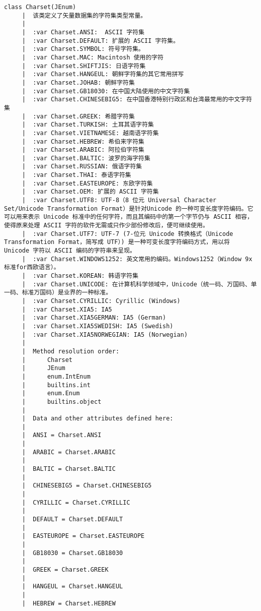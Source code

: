 \documentclass[11pt]{article}
\begin{document}
\begin{Verbatim}[commandchars=\\\{\}]
    class Charset(JEnum)
     |  该类定义了矢量数据集的字符集类型常量。
     |  
     |  :var Charset.ANSI:  ASCII 字符集
     |  :var Charset.DEFAULT: 扩展的 ASCII 字符集。
     |  :var Charset.SYMBOL: 符号字符集。
     |  :var Charset.MAC: Macintosh 使用的字符
     |  :var Charset.SHIFTJIS: 日语字符集
     |  :var Charset.HANGEUL: 朝鲜字符集的其它常用拼写
     |  :var Charset.JOHAB: 朝鲜字符集
     |  :var Charset.GB18030: 在中国大陆使用的中文字符集
     |  :var Charset.CHINESEBIG5: 在中国香港特别行政区和台湾最常用的中文字符集
     |  :var Charset.GREEK: 希腊字符集
     |  :var Charset.TURKISH: 土耳其语字符集
     |  :var Charset.VIETNAMESE: 越南语字符集
     |  :var Charset.HEBREW: 希伯来字符集
     |  :var Charset.ARABIC: 阿拉伯字符集
     |  :var Charset.BALTIC: 波罗的海字符集
     |  :var Charset.RUSSIAN: 俄语字符集
     |  :var Charset.THAI: 泰语字符集
     |  :var Charset.EASTEUROPE: 东欧字符集
     |  :var Charset.OEM: 扩展的 ASCII 字符集
     |  :var Charset.UTF8: UTF-8（8 位元 Universal Character Set/Unicode Transformation Format）是针对Unicode 的一种可变长度字符编码。它可以用来表示 Unicode 标准中的任何字符，而且其编码中的第一个字节仍与 ASCII 相容，使得原来处理 ASCII 字符的软件无需或只作少部份修改后，便可继续使用。
     |  :var Charset.UTF7: UTF-7 (7-位元 Unicode 转换格式（Unicode Transformation Format，简写成 UTF）) 是一种可变长度字符编码方式，用以将 Unicode 字符以 ASCII 编码的字符串来呈现。
     |  :var Charset.WINDOWS1252: 英文常用的编码。Windows1252（Window 9x标准for西欧语言）。
     |  :var Charset.KOREAN: 韩语字符集
     |  :var Charset.UNICODE: 在计算机科学领域中，Unicode（统一码、万国码、单一码、标准万国码）是业界的一种标准。
     |  :var Charset.CYRILLIC: Cyrillic (Windows)
     |  :var Charset.XIA5: IA5
     |  :var Charset.XIA5GERMAN: IA5 (German)
     |  :var Charset.XIA5SWEDISH: IA5 (Swedish)
     |  :var Charset.XIA5NORWEGIAN: IA5 (Norwegian)
     |  
     |  Method resolution order:
     |      Charset
     |      JEnum
     |      enum.IntEnum
     |      builtins.int
     |      enum.Enum
     |      builtins.object
     |  
     |  Data and other attributes defined here:
     |  
     |  ANSI = Charset.ANSI
     |  
     |  ARABIC = Charset.ARABIC
     |  
     |  BALTIC = Charset.BALTIC
     |  
     |  CHINESEBIG5 = Charset.CHINESEBIG5
     |  
     |  CYRILLIC = Charset.CYRILLIC
     |  
     |  DEFAULT = Charset.DEFAULT
     |  
     |  EASTEUROPE = Charset.EASTEUROPE
     |  
     |  GB18030 = Charset.GB18030
     |  
     |  GREEK = Charset.GREEK
     |  
     |  HANGEUL = Charset.HANGEUL
     |  
     |  HEBREW = Charset.HEBREW

\end{Verbatim}
\end{document}
